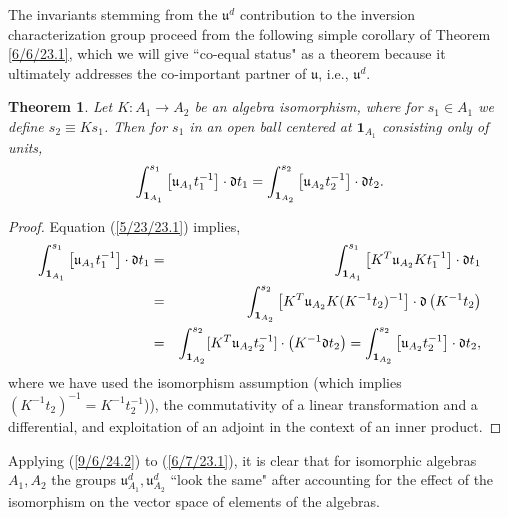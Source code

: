 \documentclass{amsart}
\numberwithin{equation}{section}
\newtheorem{theorem}{Theorem}
\theoremstyle{definition}
\numberwithin{theorem}{section}
\begin{document}
The invariants stemming from the $\mathfrak{u}^d$ contribution to the inversion characterization group proceed from the following simple corollary of Theorem \ref{6/6/23.1}, which we will give ``co-equal status" as a theorem because it ultimately addresses the co-important  partner of $\mathfrak{u}$, i.e., $\mathfrak{u}^d$. 

\begin{theorem}\label{6/6/23.2} Let $K:A_1\rightarrow A_2$ be an algebra isomorphism, where for $s_1\in A_1$ we define $s_2\equiv Ks_1$.  Then for $s_1$ in an open ball centered at $\mathbf{1}_{A_1}$ consisting only of units, \begin{equation}\label{9/6/24.2} \int_{{\bf 1}_{A_1}}^{s_1} \left[\mathfrak{u}_{A_1}t_1^{-1}\right]\cdot \mathfrak{d}t_1 
= \int_{{\bf 1}_{A_2}}^{s_2} \left[\mathfrak{u}_{A_2}t_2^{-1}\right]\cdot \mathfrak{d}t_2 . \end{equation} \end{theorem}

\begin{proof} 
Equation (\ref{5/23/23.1}) implies,
\begin{eqnarray*} \int_{{\bf 1}_{A_1}}^{s_1} \left[\mathfrak{u}_{A_1}t_1^{-1}\right]\cdot \mathfrak{d}t_1 &=& \int_{{\bf 1}_{A_1}}^{s_1} \left[ K^T\mathfrak{u}_{A_2}Kt_1^{-1}\right]\cdot \mathfrak{d}t_1 \\ &=& 
\int_{{\bf 1}_{A_2}}^{s_2} \left[ K^T\mathfrak{u}_{A_2}K (K^{-1}t_2)^{-1}\right]\cdot \mathfrak{d}\left(K^{-1}t_2\right) \\ &=& \int_{{\bf 1}_{A_2}}^{s_2} [K^T\mathfrak{u}_{A_2}t_2^{-1}]\cdot \left(K^{-1}\mathfrak{d}t_2\right) = \int_{{\bf 1}_{A_2}}^{s_2} \left[\mathfrak{u}_{A_2}t_2^{-1}\right]\cdot \mathfrak{d}t_2, 
\end{eqnarray*} 
where we have used the isomorphism assumption (which implies $(K^{-1}t_2)^{-1} = K^{-1}t_2^{-1}$)), the commutativity of a linear transformation and a differential, and exploitation of an adjoint in the context of an inner product.
\end{proof}

Applying (\ref{9/6/24.2}) to (\ref{6/7/23.1}), it is clear that for isomorphic algebras $A_1,A_2$ the groups $\mathfrak{u}^d_{A_1},  \mathfrak{u}^d_{A_2}$ ``look the same" after accounting for the effect of the isomorphism on the vector space of elements of the algebras.
\end{document}
